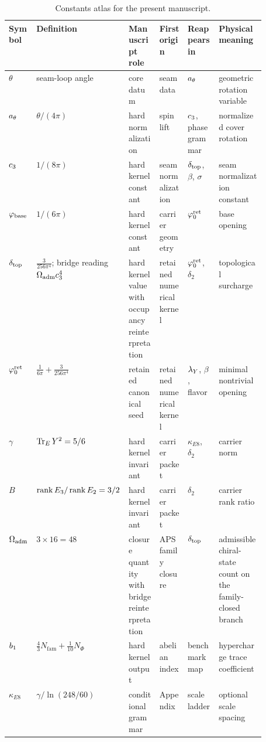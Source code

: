 \begin{table}[t]
\centering
\scriptsize
\setlength{\tabcolsep}{3pt}
\begin{tabularx}{\linewidth}{@{}>{\raggedright\arraybackslash}p{0.10\linewidth}>{\raggedright\arraybackslash}p{0.18\linewidth}>{\raggedright\arraybackslash}p{0.12\linewidth}>{\raggedright\arraybackslash}p{0.11\linewidth}YY@{}}
\toprule
Symbol & Definition & Manuscript role & First origin & Reappears in & Physical meaning \\
\midrule
$\theta$ & seam-loop angle & core datum & seam data & $a_\theta$ & geometric rotation variable \\
$a_\theta$ & $\theta/(4\pi)$ & hard normalization & spin lift & $c_3$, phase grammar & normalized cover rotation \\
$c_3$ & $1/(8\pi)$ & hard kernel constant & seam normalization & $\delta_{\mathrm{top}}$, $\beta$, $\sigma$ & seam normalization constant \\
$\varphi_{\mathrm{base}}$ & $1/(6\pi)$ & hard kernel constant & carrier geometry & $\varphi_0^{\mathrm{ret}}$ & base opening \\
$\delta_{\mathrm{top}}$ & $\frac{3}{256\pi^4}$; bridge reading $\Omega_{\mathrm{adm}}c_3^4$ & hard kernel value with occupancy reinterpretation & retained numerical kernel & $\varphi_0^{\mathrm{ret}}$, $\delta_2$ & topological surcharge \\
$\varphi_0^{\mathrm{ret}}$ & $\frac{1}{6\pi}+\frac{3}{256\pi^4}$ & retained canonical seed & retained numerical kernel & $\lambda_Y$, $\beta$, flavor & minimal nontrivial opening \\
$\gamma$ & $\operatorname{Tr}_EY^2=5/6$ & hard kernel invariant & carrier packet & $\kappa_{E8}$, $\delta_2$ & carrier norm \\
$B$ & $\operatorname{rank} E_3/\operatorname{rank} E_2=3/2$ & hard kernel invariant & carrier packet & $\delta_2$ & carrier rank ratio \\
$\Omega_{\mathrm{adm}}$ & $3\times16=48$ & closure quantity with bridge reinterpretation & APS family closure & $\delta_{\mathrm{top}}$ & admissible chiral-state count on the family-closed branch \\
$b_1$ & $\frac43N_{\mathrm{fam}}+\frac1{10}N_\Phi$ & hard kernel output & abelian index & benchmark map & hypercharge trace coefficient \\
$\kappa_{E8}$ & $\gamma/\ln(248/60)$ & conditional grammar & Appendix~ & scale ladder & optional scale spacing \\
\bottomrule
\end{tabularx}
\caption{Constants atlas for the present manuscript.}
\label{tab:constants-atlas}
\end{table}

